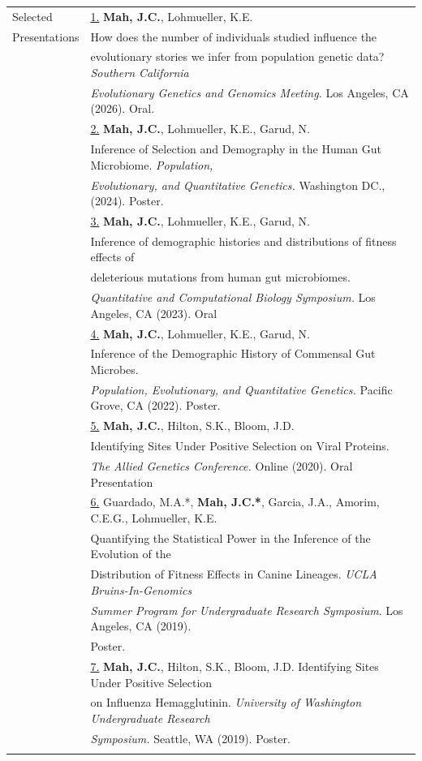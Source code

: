 \documentclass[letterpaper,11pt,oneside]{article}
\begin{document}
\begin{tabular}{@{} l l}
	\Large{Selected} & \underline{1.} \textbf{Mah, J.C.}, Lohmueller, K.E.\\
	\Large{Presentations} & How does the number of individuals studied influence the \\
	& evolutionary stories we infer from population genetic data? \textit{Southern California} \\
	& \textit{Evolutionary Genetics and Genomics Meeting.} Los Angeles, CA (2026). Oral.\\
	& \underline{2.} \textbf{Mah, J.C.}, Lohmueller, K.E., Garud, N. \\
	& Inference of Selection and Demography in the Human Gut Microbiome. \textit{Population,} \\
	& \textit{Evolutionary, and Quantitative Genetics.} Washington DC., (2024). Poster.\\
	& \underline{3.} \textbf{Mah, J.C.}, Lohmueller, K.E., Garud, N. \\ 
	& Inference of demographic histories and distributions of fitness effects of\\
	&  deleterious mutations from human gut microbiomes. \\
	& \textit{Quantitative and Computational Biology Symposium.} Los Angeles, CA (2023). Oral\\
	& \underline{4.} \textbf{Mah, J.C.}, Lohmueller, K.E., Garud, N. \\ 
	& Inference of the Demographic History of Commensal Gut Microbes. \\
	& \textit{Population, Evolutionary, } \textit{and Quantitative Genetics.} Pacific Grove, CA (2022). Poster.\\
	& \underline{5.} \textbf{Mah, J.C.}, Hilton, S.K., Bloom, J.D. \\
	& Identifying Sites Under Positive Selection on Viral Proteins. \\
	& \textit{The Allied Genetics Conference.} Online (2020). Oral Presentation \\
	& \underline{6.} Guardado, M.A.*, \textbf{Mah, J.C.*}, Garcia, J.A., Amorim, C.E.G., Lohmueller, K.E. \\
	& Quantifying the Statistical Power in the Inference of the Evolution of the \\
	& Distribution of Fitness Effects in Canine Lineages. \textit{UCLA Bruins-In-Genomics} \\
	& \textit{Summer Program for Undergraduate Research Symposium}. Los Angeles, CA (2019). \\
	& Poster. \\
	& \underline{7.} \textbf{Mah, J.C.}, Hilton, S.K., Bloom, J.D. Identifying Sites Under Positive Selection\\
	& on Influenza Hemagglutinin. \textit{University of Washington Undergraduate Research} \\
	& \textit{Symposium.} Seattle, WA (2019). Poster. \\

	\tabularnewline   
\end{tabular}	
\end{document}

